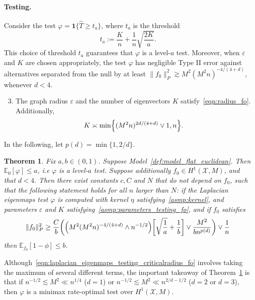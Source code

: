 \documentclass{article}
\newcommand{\1}{\mathbf{1}}
\newcommand{\mc}[1]{\mathcal{#1}}
\newcommand{\Ebb}{\mathbb{E}}
\newcommand{\wh}[1]{\widehat{#1}}
\theoremstyle{alden}
\theoremstyle{aldenthm}
\newtheorem{theorem}{Theorem}
\theoremstyle{definition}
\theoremstyle{remark}
\begin{document}
\paragraph{Testing.} Consider the test $\varphi = \1\{\wh{T} \geq t_{a}\}$, where $t_{a}$ is the threshold
\begin{equation*}
t_{a} := \frac{K}{n} + \frac{1}{n}\sqrt{\frac{2K}{a}}.
\end{equation*}
This choice of threshold $t_{a}$ guarantees that $\varphi$ is a level-$a$ test. Moreover, when $\varepsilon$ and $K$ are chosen appropriately, the test $\varphi$ has negligible Type II error against alternatives separated from the null by at least $\|f_0\|_{P}^2 \gtrsim M^2(M^2n)^{-4/(4 + d)}$, whenever $d < 4$. 

\begin{enumerate}[label=(A\arabic*)]
	\setcounter{enumi}{2}
	\item 
	\label{asmp:parameters_testing_fo}
	The graph radius $\varepsilon$ and the number of eigenvectors $K$ satisfy~\eqref{eqn:radius_fo}. Additionally,
	\begin{equation}
	\label{eqn:eigenvector_testing_fo}
	K \asymp \min\Bigl\{(M^2n)^{2d/(4 + d)} \vee 1, n\Bigr\}.
	\end{equation}
\end{enumerate}
In the following, let $p(d) = \min\{1,2/d\}$.
\begin{theorem}
	\label{thm:laplacian_eigenmaps_testing_fo}
	Fix $a,b \in (0,1)$. Suppose Model~\ref{def:model_flat_euclidean}. Then $\mathbb{E}_0[\varphi] \leq a$, i.e $\varphi$ is a level-$a$ test. Suppose additionally $f_0 \in H^1(\mc{X},M)$, and that $d < 4$. Then there exist constants $c,C$ and $N$ that do not depend on $f_0$, such that the following statement holds for all $n$ larger than $N$: if the Laplacian eigenmaps test $\varphi$ is computed with kernel $\eta$ satisfying~\ref{asmp:kernel}, and parameters $\varepsilon$ and $K$ satisfying~\ref{asmp:parameters_testing_fo}, and if $f_0$ satisfies
	\begin{equation}
	\label{eqn:laplacian_eigenmaps_testing_criticalradius_fo}
	\|f_0\|_P^2 \geq \frac{C}{b}\biggl(\Bigl(M^2(M^2n)^{-4/(4 + d) } \wedge n^{-1/2}\Bigr)\biggl[\sqrt{\frac{1}{a}} + \frac{1}{b}\biggr] \vee \frac{M^2}{b n^{p(d)}} \biggr) \vee \frac{1}{n}
	\end{equation}
	then $\Ebb_{f_0}[1 - \phi] \leq b$.
\end{theorem}
Although~\eqref{eqn:laplacian_eigenmaps_testing_criticalradius_fo} involves taking the maximum of several different terms, the important takeaway of Theorem~\ref{thm:laplacian_eigenmaps_testing_fo} is that if $n^{-1/2} \lesssim M^2 \ll n^{1/4}$ ($d = 1$) or $n^{-1/2} \lesssim M^2 \ll n^{2/d - 1/2}$ ($d = 2$ or $d = 3$), then $\varphi$ is a minimax rate-optimal test over $H^1(\mc{X},M)$.
\end{document}
